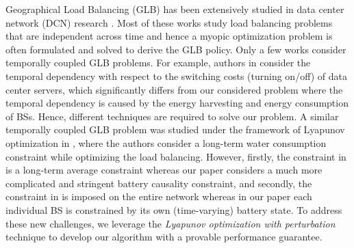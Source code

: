 \documentclass[12pt, draftclsnofoot, letterpaper, onecolumn]{IEEEtran}
\begin{document}


Geographical Load Balancing (GLB) has been extensively studied in data center network (DCN) research \cite{lin2012online, xu2015temperature, lou2015spatio, liu2015greening, islam2015water}. Most of these works study load balancing problems that are independent across time and hence a myopic optimization problem is often formulated and solved to derive the GLB policy. Only a few works consider temporally coupled GLB problems. For example, authors in \cite{lin2012online} consider the temporal dependency with respect to the switching costs (turning on/off) of data center servers, which significantly differs from our considered problem where the temporal dependency is caused by the energy harvesting and energy consumption of BSs. Hence, different techniques are required to solve our problem. A similar temporally coupled GLB problem was studied under the framework of Lyapunov optimization in \cite{islam2015water}, where the authors consider a long-term water consumption constraint while optimizing the load balancing. However, firstly, the constraint in \cite{islam2015water} is a long-term average constraint whereas our paper considers a much more complicated and stringent battery causality constraint, and secondly, the constraint in \cite{islam2015water} is imposed on the entire network whereas in our paper each individual BS is constrained by its own (time-varying) battery state. To address these new challenges, we leverage the \emph{Lyapunov optimization with perturbation} technique \cite{neely2010dynamic} to develop our algorithm with a provable performance guarantee.
\end{document}

